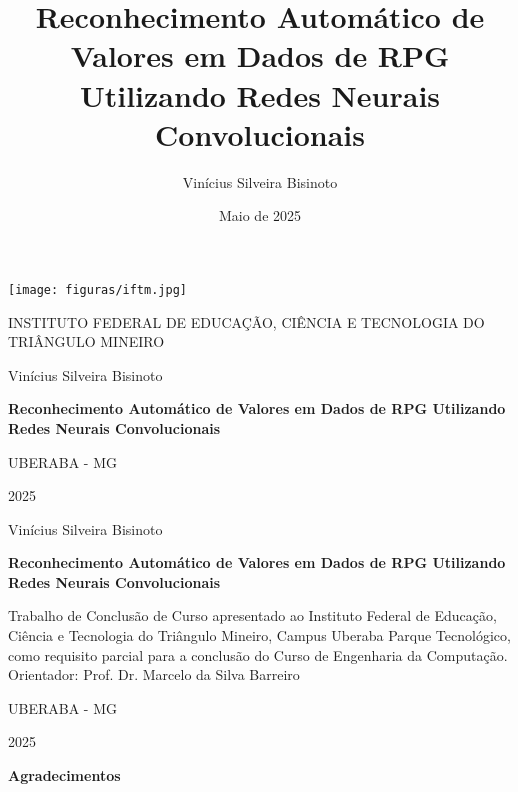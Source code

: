 \documentclass[12pt]{article}
\title{Reconhecimento Automático de Valores em Dados de RPG Utilizando Redes Neurais Convolucionais}
\author{Vinícius Silveira Bisinoto}
\date{Maio de 2025}
\begin{document}
\begin{titlepage}
    \centering
    \texttt{[image: figuras/iftm.jpg]}\par
    {\scshape\Large INSTITUTO FEDERAL DE EDUCAÇÃO, CIÊNCIA E TECNOLOGIA DO TRIÂNGULO MINEIRO \par}
    \vfill
    {\Large Vinícius Silveira Bisinoto\par}
    \vfill
    {\bfseries\Large Reconhecimento Automático de Valores em Dados de RPG Utilizando Redes Neurais Convolucionais\par}
    \vfill
    {\large UBERABA - MG\par}
    {\large 2025\par}
\end{titlepage}


\begin{titlepage}
    \centering
    {\Large Vinícius Silveira Bisinoto\par}
    \vspace{1.5cm}
    {\bfseries\Large Reconhecimento Automático de Valores em Dados de RPG Utilizando Redes Neurais Convolucionais\par}
    \vfill
    \begin{flushright}
        \begin{minipage}{0.5\textwidth}
            Trabalho de Conclusão de Curso apresentado ao Instituto Federal de Educação, 
            Ciência e Tecnologia do Triângulo Mineiro, Campus Uberaba Parque Tecnológico, 
            como requisito parcial para a conclusão do Curso de Engenharia da Computação.\\
            Orientador: Prof. Dr. Marcelo da Silva Barreiro
        \end{minipage}
    \end{flushright}
    \vfill
    {\large UBERABA - MG\par}
    {\large2025\par}
\end{titlepage}

\begin{center}
    \Large\textbf{Agradecimentos}
\end{center}
\end{document}
